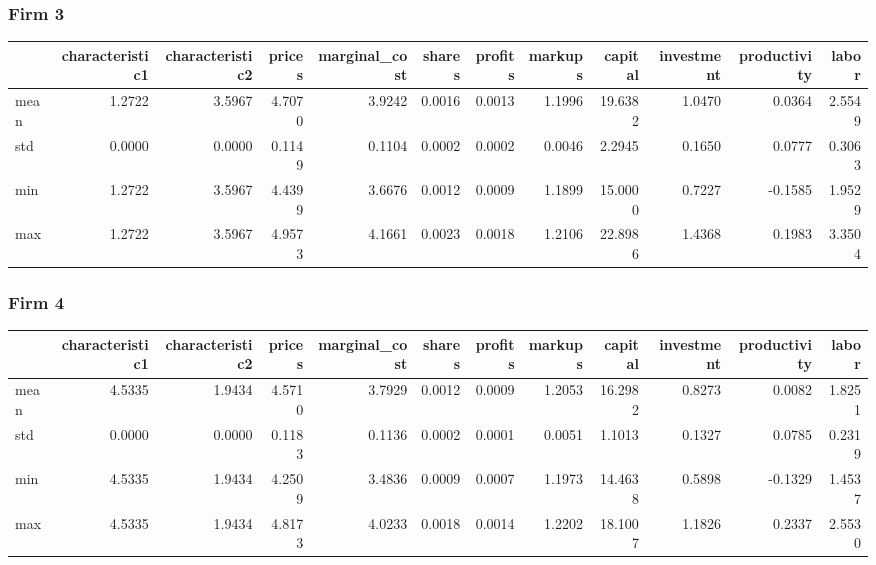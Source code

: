  \subsubsection*{Firm 3}
\begin{tabular}{lrrrrrrrrrrr}
\toprule
{} &  characteristic1 &  characteristic2 &  prices &  marginal\_cost &  shares &  profits &  markups &  capital &  investment &  productivity &  labor \\
\midrule
mean &           1.2722 &           3.5967 &  4.7070 &         3.9242 &  0.0016 &   0.0013 &   1.1996 &  19.6382 &      1.0470 &        0.0364 & 2.5549 \\
std  &           0.0000 &           0.0000 &  0.1149 &         0.1104 &  0.0002 &   0.0002 &   0.0046 &   2.2945 &      0.1650 &        0.0777 & 0.3063 \\
min  &           1.2722 &           3.5967 &  4.4399 &         3.6676 &  0.0012 &   0.0009 &   1.1899 &  15.0000 &      0.7227 &       -0.1585 & 1.9529 \\
max  &           1.2722 &           3.5967 &  4.9573 &         4.1661 &  0.0023 &   0.0018 &   1.2106 &  22.8986 &      1.4368 &        0.1983 & 3.3504 \\
\bottomrule
\end{tabular}


 \subsubsection*{Firm 4}
\begin{tabular}{lrrrrrrrrrrr}
\toprule
{} &  characteristic1 &  characteristic2 &  prices &  marginal\_cost &  shares &  profits &  markups &  capital &  investment &  productivity &  labor \\
\midrule
mean &           4.5335 &           1.9434 &  4.5710 &         3.7929 &  0.0012 &   0.0009 &   1.2053 &  16.2982 &      0.8273 &        0.0082 & 1.8251 \\
std  &           0.0000 &           0.0000 &  0.1183 &         0.1136 &  0.0002 &   0.0001 &   0.0051 &   1.1013 &      0.1327 &        0.0785 & 0.2319 \\
min  &           4.5335 &           1.9434 &  4.2509 &         3.4836 &  0.0009 &   0.0007 &   1.1973 &  14.4638 &      0.5898 &       -0.1329 & 1.4537 \\
max  &           4.5335 &           1.9434 &  4.8173 &         4.0233 &  0.0018 &   0.0014 &   1.2202 &  18.1007 &      1.1826 &        0.2337 & 2.5530 \\
\bottomrule
\end{tabular}


